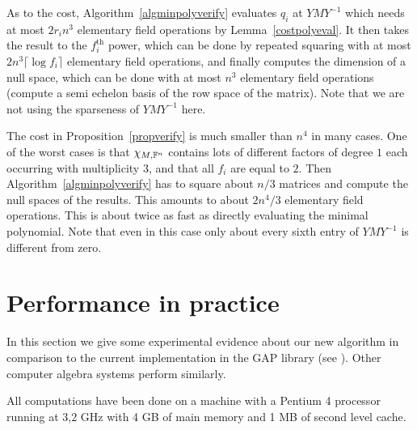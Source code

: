 As to the cost, Algorithm~\ref{algminpolyverify} evaluates $q_i$ at 
$YMY^{-1}$ which needs at most $2r_i n^3$ elementary field operations
by Lemma~\ref{costpolyeval}. It then takes the result to the
$f_i^{\mathrm{th}}$ power, which can be done by repeated squaring
with at most $2n^3\lceil \log f_i \rceil$ elementary field operations, and 
finally computes the dimension of a null space, which can be done with at most
$n^3$ elementary field operations (compute a semi echelon basis
of the row space of the matrix). Note that we are not using the 
sparseness of $YMY^{-1}$ here.
\proofend

\begin{Rem}
The cost in Proposition~\ref{propverify} is much smaller than $n^4$ in
many cases. One of the worst cases is that $\chi_{M,\mathbb{F}^n}$ contains lots of
different factors of degree $1$ each occurring with multiplicity $3$, and that
all $f_i$ are equal to $2$. Then Algorithm~\ref{algminpolyverify} has to
square about $n/3$ matrices and compute the null spaces of the results. 
This amounts to about
$2n^4/3$ elementary field operations. This is about twice as fast as 
directly evaluating the minimal polynomial. Note that even in this case
only about every sixth entry of\/ $YMY^{-1}$ is different from zero. 
\end{Rem}

\section{Performance in practice}
\label{performance}

In this section we give some experimental evidence about our 
new algorithm in comparison to the current implementation in the
{\sf GAP} library (see \cite{GAP4}). Other computer algebra systems 
perform similarly.

All computations have been done on a machine with a Pentium 4 processor
running at 3,2 GHz with 4 GB of main memory and 1 MB of second level
cache. 

